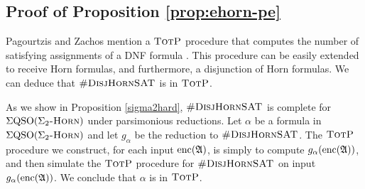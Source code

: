 \subsection*{Proof of Proposition \ref{prop:ehorn-pe}}
Pagourtzis and Zachos mention a $\text{\sc TotP}$ procedure that computes the number of satisfying assignments of a DNF formula \cite{PagourtzisZ06}. This procedure can be easily extended to receive Horn formulas, and furthermore, a disjunction of Horn formulas. We can deduce that $\textsc{\#DisjHornSAT}$ is in $\text{\sc TotP}$.

As we show in Proposition \ref{sigma2hard}, $\textsc{\#DisjHornSAT}$ is complete for $\Sigma{\rm QSO}(\Sigma_2\textsc{-Horn})$ under parsimonious reductions. Let $\alpha$ be a formula in $\Sigma{\rm QSO}(\Sigma_2\textsc{-Horn})$ and let $g_{\alpha}$ be the reduction to $\textsc{\#DisjHornSAT}$. The $\text{\sc TotP}$ procedure we construct, for each input ${\rm enc}(\mathfrak{A})$, is simply to compute $g_{\alpha}({\rm enc}(\mathfrak{A}))$, and then simulate the $\text{\sc TotP}$ procedure for $\textsc{\#DisjHornSAT}$ on input $g_{\alpha}({\rm enc}(\mathfrak{A}))$. We conclude that $\alpha$ is in $\text{\sc TotP}$.










